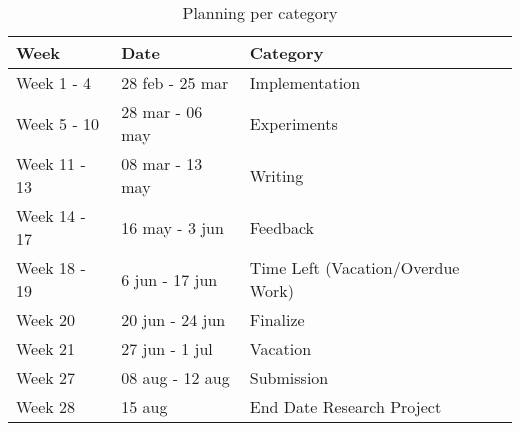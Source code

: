 \begin{table}[H]
\setlength{\tabcolsep}{8pt}
\centering
\small
\bigskip
\begin{tabular}{|l|l|l|}
    \hline
    Week & Date & Category \\
    \hline
    Week 1 - 4 & 28 feb - 25 mar & Implementation \\
    \hline
    Week 5 - 10 & 28 mar - 06 may & Experiments \\
    \hline
    Week 11 - 13 & 08 mar - 13 may & Writing \\
    \hline
    Week 14 - 17 & 16 may - 3 jun & Feedback \\
    \hline
    Week 18 - 19 & 6 jun - 17 jun & Time Left (Vacation/Overdue Work) \\
    \hline
    Week 20 & 20 jun - 24 jun & Finalize \\
    \hline
    Week 21 & 27 jun - 1 jul & Vacation \\
    \hline
    Week 27 & 08 aug - 12 aug & Submission \\
    \hline 
    Week 28 & 15 aug & End Date Research Project  \\
    \hline
\end{tabular}
\caption{Planning per category}
\label{table:planning}
\end{table}